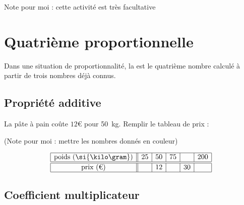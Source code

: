 Note pour moi : cette activité est très facultative 

 

\section{Quatrième proportionnelle}

\begin{definition}
    Dans une situation de proportionnalité, la  est le quatrième nombre calculé à partir de trois nombres déjà connus.
\end{definition}

\subsection{Propriété additive}

La pâte à pain coûte \( 12\)€ pour \SI{50}{\kilo\gram}. Remplir le tableau de prix :

(Note pour moi : mettre les nombres donnés en couleur)

\begin{equation*}
    \begin{array}[]{|c||c|c|c|c|c|}
        \hline
        \text{poids (\si{\kilo\gram})}&25&50&75&&200\\
        \hline\hline
        \text{prix (€)}&&12&&30&\\
        \hline
    \end{array}
\end{equation*}

\subsection{Coefficient multiplicateur}

